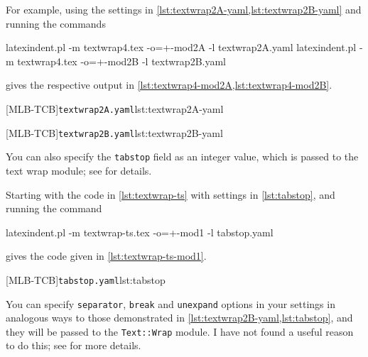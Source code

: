  \begin{example}
 For example, using the settings in \cref{lst:textwrap2A-yaml,lst:textwrap2B-yaml} and
 running the commands  

 \begin{commandshell}
	 latexindent.pl -m textwrap4.tex -o=+-mod2A -l textwrap2A.yaml
	 latexindent.pl -m textwrap4.tex -o=+-mod2B -l textwrap2B.yaml
\end{commandshell}

 gives the respective output in \cref{lst:textwrap4-mod2A,lst:textwrap4-mod2B}.

 \begin{cmhtcbraster}[raster column skip=.1\linewidth]
  [MLB-TCB]{\texttt{textwrap2A.yaml}}{lst:textwrap2A-yaml}

  [MLB-TCB]{\texttt{textwrap2B.yaml}}{lst:textwrap2B-yaml}
 \end{cmhtcbraster}
 \end{example}

 You can also specify the \texttt{tabstop} field  as an integer value, which is passed to the text wrap module; see
 \cite{textwrap} for details.

 \begin{example}
 Starting with the code in \cref{lst:textwrap-ts} with settings in \cref{lst:tabstop}, and
 running the command  

 \begin{commandshell}
	 latexindent.pl -m textwrap-ts.tex -o=+-mod1 -l tabstop.yaml
	 \end{commandshell}

 gives the code given in \cref{lst:textwrap-ts-mod1}.
 \begin{cmhtcbraster}[raster columns=3,
   raster left skip=-3.5cm,
   raster right skip=-2cm,
   raster column skip=.03\linewidth]
  [MLB-TCB]{\texttt{tabstop.yaml}}{lst:tabstop}
 \end{cmhtcbraster}
 \end{example}

 You can specify \texttt{separator}, \texttt{break} and \texttt{unexpand} options in your
 settings in analogous ways to those demonstrated in
 \cref{lst:textwrap2B-yaml,lst:tabstop}, and they will be passed to the
 \texttt{Text::Wrap} module. I have not found a useful reason to do this; see
 \cite{textwrap} for more details.
